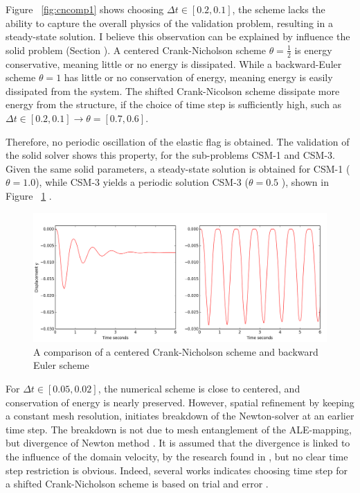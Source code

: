 Figure ~\ref{fig:cncomp1} shows choosing $\Delta t \in [0.2, 0.1]$, the scheme lacks the ability to capture the overall physics of the validation problem, resulting in a steady-state solution. I believe this observation can be explained by influence the solid problem (Section \label{sec:solprob}). A centered Crank-Nicholson scheme $\theta= \frac{1}{2}$ is energy conservative, meaning little or no energy is dissipated. While a backward-Euler scheme $\theta = 1$  has little or no conservation of energy, meaning energy is easily dissipated from the system. The shifted Crank-Nicolson scheme dissipate more energy from the structure, if the choice of time step is sufficiently high, such as $\Delta t \in [0.2, 0.1] \rightarrow \theta = [0.7, 0.6]$. 

\newpage
 
 Therefore, no periodic oscillation of the elastic flag is obtained. The validation of the solid solver shows this property, for the sub-problems CSM-1 and CSM-3. Given the same solid parameters, a steady-state solution is obtained for CSM-1 ($\theta = 1.0 $), while CSM-3 yields a periodic solution CSM-3 ($\theta = 0.5$ ), shown in Figure ~\ref{fig:csm1scm3} .

\begin{figure}[h!]
 	\centering
    \includegraphics[scale=0.4]{./Fig/thetacompare.png}
      \caption{A comparison of a centered Crank-Nicholson scheme and backward Euler scheme}
\label{fig:csm1scm3}
\end{figure}

For  $\Delta t \in [0.05, 0.02]$,  the numerical scheme is close to centered, and conservation of energy is nearly preserved. However, spatial refinement by keeping a constant mesh resolution, initiates breakdown of the Newton-solver at an earlier time step. The breakdown is not due to mesh entanglement of the ALE-mapping, but divergence of Newton method \cite{Richter2015}. It is assumed that the divergence is linked to the influence of the domain velocity, by the research found in \cite{Formaggia2004}, but no clear time step restriction is obvious. Indeed, several works indicates choosing time step for a shifted Crank-Nicholson scheme is based on trial and error \cite{Wicka, Wick2013a}. 


